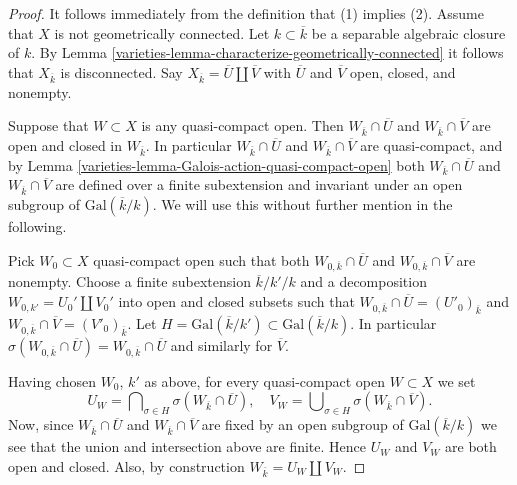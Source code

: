 \begin{proof}

It follows immediately from the definition that (1) implies (2).
Assume that $X$ is not geometrically connected.
Let $k \subset \overline{k}$ be a separable algebraic
closure of $k$. By
Lemma \ref{varieties-lemma-characterize-geometrically-connected}
it follows that $X_{\overline{k}}$ is disconnected.
Say $X_{\overline{k}} = \overline{U} \amalg \overline{V}$
with $\overline{U}$ and $\overline{V}$ open, closed, and nonempty.

\medskip\noindent
Suppose that $W \subset X$ is any quasi-compact open.
Then $W_{\overline{k}} \cap \overline{U}$ and
$W_{\overline{k}} \cap \overline{V}$ are open and closed in
$W_{\overline{k}}$. In particular $W_{\overline{k}} \cap \overline{U}$ and
$W_{\overline{k}} \cap \overline{V}$ are quasi-compact, and by
Lemma \ref{varieties-lemma-Galois-action-quasi-compact-open}
both $W_{\overline{k}} \cap \overline{U}$ and
$W_{\overline{k}} \cap \overline{V}$
are defined over a finite subextension and invariant under an
open subgroup of $\text{Gal}(\overline{k}/k)$.
We will use this without further mention in the following.

\medskip\noindent
Pick $W_0 \subset X$ quasi-compact open such that both
$W_{0, \overline{k}} \cap \overline{U}$ and
$W_{0, \overline{k}} \cap \overline{V}$ are nonempty.
Choose a finite subextension $\overline{k}/k'/k$
and a decomposition $W_{0, k'} = U_0' \amalg V_0'$ into open and closed
subsets such that
$W_{0, \overline{k}} \cap \overline{U} = (U'_0)_{\overline{k}}$ and
$W_{0, \overline{k}} \cap \overline{V} = (V'_0)_{\overline{k}}$.
Let $H = \text{Gal}(\overline{k}/k') \subset \text{Gal}(\overline{k}/k)$.
In particular
$\sigma(W_{0, \overline{k}} \cap \overline{U}) =
W_{0, \overline{k}} \cap \overline{U}$ and similarly for
$\overline{V}$.

\medskip\noindent
Having chosen $W_0$, $k'$ as above, for every quasi-compact open
$W \subset X$ we set
$$
U_W =
\bigcap\nolimits_{\sigma \in H} \sigma(W_{\overline{k}} \cap \overline{U}),
\quad
V_W =
\bigcup\nolimits_{\sigma \in H} \sigma(W_{\overline{k}} \cap \overline{V}).
$$
Now, since $W_{\overline{k}} \cap \overline{U}$ and
$W_{\overline{k}} \cap \overline{V}$ are fixed by an open subgroup of
$\text{Gal}(\overline{k}/k)$ we see that the union and intersection
above are finite. Hence $U_W$ and $V_W$ are both open and closed.
Also, by construction $W_{\bar k} = U_W \amalg V_W$.


\end{proof}
